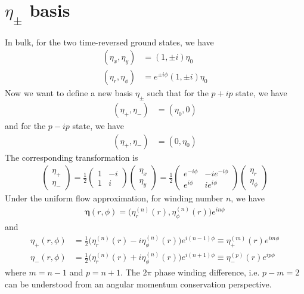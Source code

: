 \documentclass[aps,prl,preprint]{revtex4-2}
\begin{document}
\section{$\eta_\pm$ basis}

In bulk, for the two time-reversed ground states, we have
\begin{align}
    (\eta_x, \eta_y)    & = (1, \pm i)\eta_0              \\
    (\eta_r, \eta_\phi) & = e^{\pm i\phi}(1, \pm i)\eta_0
\end{align}
Now we want to define a new basis $\eta_\pm$ such that for the $p+ip$ state, we have
\begin{align}
    (\eta_+, \eta_-) & = (\eta_0, 0)
\end{align}
and for the $p-ip$ state, we have
\begin{align}
    (\eta_+, \eta_-) & = (0, \eta_0)
\end{align}
The corresponding transformation is
\begin{align}
    \begin{pmatrix}
        \eta_+ \\
        \eta_-
    \end{pmatrix}
    = \frac{1}{2}
    \begin{pmatrix}
        1 & -i \\
        1 & i
    \end{pmatrix}
    \begin{pmatrix}
        \eta_x \\
        \eta_y
    \end{pmatrix}
    = \frac{1}{2}
    \begin{pmatrix}
        e^{-i\phi} & -ie^{-i\phi} \\
        e^{i\phi}  & ie^{i\phi}
    \end{pmatrix}
    \begin{pmatrix}
        \eta_r \\
        \eta_\phi
    \end{pmatrix}
\end{align}
Under the uniform flow approximation, for winding number $n$, we have
\begin{align}
    \bm{\eta}(r, \phi) = \bigg(\eta_r^{(n)}(r), \eta_\phi^{(n)}(r)\bigg) e^{in\phi}
\end{align}
and
\begin{align}
    \eta_+(r,\phi)
     & = \frac{1}{2}\bigg(\eta_r^{(n)}(r) - i\eta_\phi^{(n)}(r)\bigg)e^{i(n-1)\phi}
    \equiv \eta_+^{(m)}(r)e^{im\phi}                                                \\
    \eta_-(r,\phi)
     & = \frac{1}{2}\bigg(\eta_r^{(n)}(r) + i\eta_\phi^{(n)}(r)\bigg)e^{i(n+1)\phi}
    \equiv \eta_-^{(p)}(r)e^{ip\phi}
\end{align}
where $m=n-1$ and $p=n+1$. The $2\pi$ phase winding difference, i.e. $p-m=2$
can be understood from an angular momentum conservation perspective.
\end{document}
